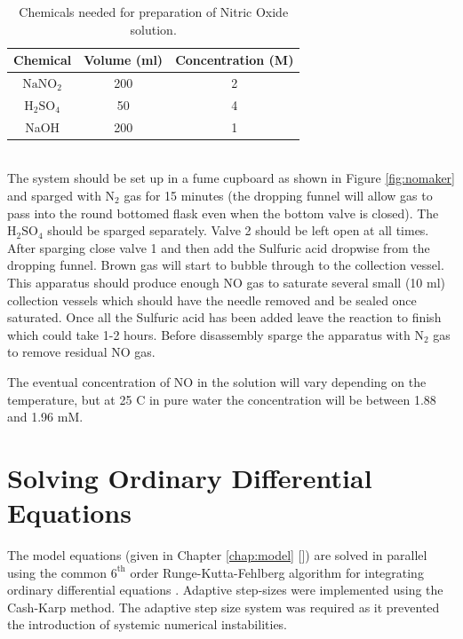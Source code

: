 \begin{table}[here]
\begin{center}
\begin{tabular}{ccc}
\toprule
\textbf{Chemical} & \textbf{Volume (ml)} & \textbf{Concentration (M)} \\
\midrule
$\textrm{NaNO}_2$ & 200 & 2 \\
$\textrm{H}_2\textrm{SO}_4$ & 50 & 4 \\
NaOH & 200 & 1 \\
\bottomrule
\end{tabular} 
\end{center}
\caption{Chemicals needed for preparation of Nitric Oxide solution.
\label{tab:nomakerchem}}
\end{table}\\
The system should be set up in a fume cupboard as shown in Figure \ref{fig:nomaker} and sparged with $\textrm{N}_2$ gas for 15 minutes (the dropping funnel will allow gas to pass into the round bottomed flask even when the bottom valve is closed). The $\textrm{H}_2\textrm{SO}_4$ should be sparged separately. Valve 2 should be left open at all times. After sparging close valve 1 and then add the Sulfuric acid dropwise from the dropping funnel. Brown gas will start to bubble through to the collection vessel. This apparatus should produce enough NO gas to saturate several small (10 ml) collection vessels which should have the needle removed and be sealed once saturated. Once all the Sulfuric acid has been added leave the reaction to finish which could take 1-2 hours. Before disassembly sparge the apparatus with $\textrm{N}_2$ gas to remove residual NO gas.

The eventual concentration of NO in the solution will vary depending on the temperature, but at 25 \textdegree{}C in pure water the concentration will be between 1.88 and 1.96 mM\cite{Aga2008,Cole2008}.

\section{Solving Ordinary Differential Equations}
The model equations (given in Chapter \ref{chap:model} []) are solved in parallel using the common $\mathrm{6}^\mathrm{th}$ order Runge-Kutta-Fehlberg algorithm for integrating ordinary differential equations \cite{Butcher2003}. Adaptive step-sizes were implemented using the Cash-Karp method\cite{Cash1990}. The adaptive step size system was required as it prevented the introduction of systemic numerical instabilities.

